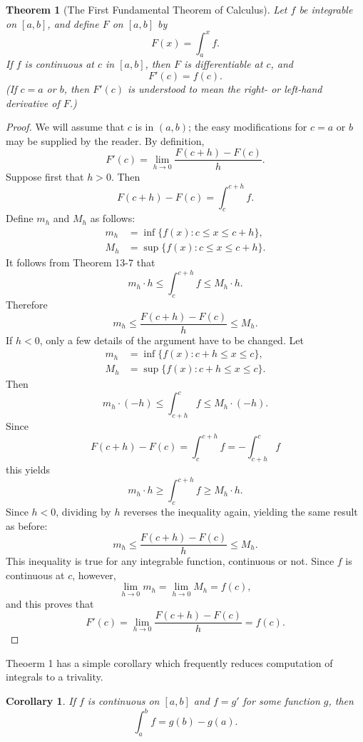 \documentclass{article}
\newtheorem{corollary}{Corollary}
\numberwithin{corollary}{subsection}
\numberwithin{definition}{subsection}
\numberwithin{lemma}{subsection}
\newtheorem{theorem}{Theorem}
\numberwithin{theorem}{subsection}
\begin{document}
\begin{theorem}[The First Fundamental Theorem of Calculus]
  Let $f$ be integrable on $[a, b]$, and define $F$ on $[a, b]$ by \[
    F(x) = \int_a^x f.
  \] If $f$ is continuous at $c$ in $[a, b]$, then $F$ is differentiable at
  $c$, and \[
    F'(c) = f(c).
  \] (If $c = a$ or $b$, then $F'(c)$ is understood to mean the right- or
  left-hand derivative of $F$.)
\end{theorem}
\begin{proof}
  We will assume that $c$ is in $(a, b)$; the easy modifications for $c = a$ or
  $b$ may be supplied by the reader. By definition, \[
    F'(c) = \lim_{h \to 0}\frac{F(c + h) - F(c)}{h}.
  \] Suppose first that $h > 0$. Then \[
    F(c + h) - F(c) = \int_c^{c + h} f.
  \] Define $m_h$ and $M_h$ as follows:
  \begin{align*}
    m_h &= \inf\{f(x): c \leq x \leq c + h\}, \\
    M_h &= \sup\{f(x): c \leq x \leq c + h\}.
  \end{align*}
  It follows from Theorem 13-7 that \[
    m_h \cdot h \leq \int_c^{c + h} f \leq M_h \cdot h.
  \] Therefore \[
    m_h \leq \frac{F(c + h) - F(c)}{h} \leq M_h.
  \] If $h < 0$, only a few details of the argument have to be changed. Let
  \begin{align*}
    m_h &= \inf\{f(x): c + h \leq x \leq c\}, \\
    M_h &= \sup\{f(x): c + h \leq x \leq c\}.
  \end{align*}
  Then \[
    m_h \cdot (-h) \leq \int_{c + h}^c f \leq M_h \cdot (-h).
  \] Since \[
    F(c + h) - F(c) = \int_c^{c + h} f = -\int_{c + h}^c f
  \] this yields \[
    m_h \cdot h \geq \int_c^{c + h} f \geq M_h \cdot h.
  \] Since $h < 0$, dividing by $h$ reverses the inequality again, yielding the
  same result as before: \[
    m_h \leq \frac{F(c + h) - F(c)}{h} \leq M_h.
  \] This inequality is true for any integrable function, continuous or not.
  Since $f$ is continuous at $c$, however, \[
    \lim_{h \to 0} m_h = \lim_{h \to 0} M_h = f(c),
  \] and this proves that \[
    F'(c) = \lim_{h \to 0} \frac{F(c + h) - F(c)}{h} = f(c).
  \]
\end{proof}

Theoerm 1 has a simple corollary which frequently reduces computation of
integrals to a trivality.

\begin{corollary}
  If $f$ is continuous on $[a, b]$ and $f = g'$ for some function $g$, then \[
    \int_a^b f = g(b) - g(a).
  \]
\end{corollary}
\end{document}
